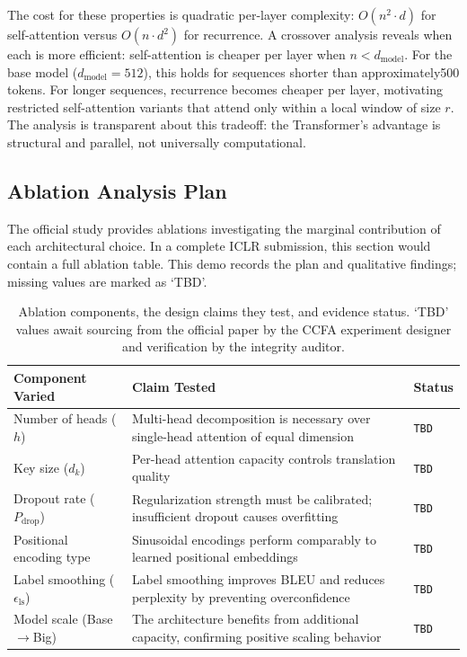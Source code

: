 ﻿\documentclass{article}
\begin{document}
The cost for these properties is quadratic per-layer complexity: $O(n^2 \cdot d)$ for self-attention versus $O(n \cdot d^2)$ for recurrence. A crossover analysis reveals when each is more efficient: self-attention is cheaper per layer when $n < d_{\text{model}}$. For the base model ($d_{\text{model}}=512$), this holds for sequences shorter than approximately500 tokens. For longer sequences, recurrence becomes cheaper per layer, motivating restricted self-attention variants that attend only within a local window of size $r$. The analysis is transparent about this tradeoff: the Transformer's advantage is structural and parallel, not universally computational.

\subsection{Ablation Analysis Plan}

The official study provides ablations investigating the marginal contribution of each architectural choice. In a complete ICLR submission, this section would contain a full ablation table. This demo records the plan and qualitative findings; missing values are marked as `TBD'.

\begin{table}[h]
 \centering
 \caption{Ablation components, the design claims they test, and evidence status. `TBD' values await sourcing from the official paper by the CCFA experiment designer and verification by the integrity auditor.}
 \label{tab:ablation}
 \small
 \begin{tabular}{P{2.6cm} P{3.8cm} P{3.8cm}}
 \toprule
 Component Varied & Claim Tested & Status \\
 \midrule
 Number of heads ($h$) & Multi-head decomposition is necessary over single-head attention of equal dimension & \texttt{TBD} \\
 Key size ($d_k$) & Per-head attention capacity controls translation quality & \texttt{TBD} \\
 Dropout rate ($P_{\text{drop}}$) & Regularization strength must be calibrated; insufficient dropout causes overfitting & \texttt{TBD} \\
 Positional encoding type & Sinusoidal encodings perform comparably to learned positional embeddings & \texttt{TBD} \\
 Label smoothing ($\epsilon_{\text{ls}}$) & Label smoothing improves BLEU and reduces perplexity by preventing overconfidence & \texttt{TBD} \\
 Model scale (Base$\to$Big) & The architecture benefits from additional capacity, confirming positive scaling behavior & \texttt{TBD} \\
 \bottomrule
 \end{tabular}
\end{table}
\end{document}
